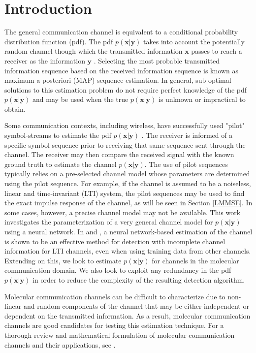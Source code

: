 \section{Introduction}

The general communication channel is equivalent to a conditional probability distribution function (pdf). The pdf $p(\mathbf{x}|\mathbf{y})$ takes into account the potentially random channel though which the transmitted information $\mathbf{x}$ passes to reach a receiver as the information $\mathbf{y}$ \cite[Ch.~7]{cover2012elements}. Selecting the most probable transmitted information sequence based on the received information sequence is known as maximum a posteriori (MAP) sequence estimation. In general, sub-optimal solutions to this estimation problem do not require perfect knowledge of the pdf $p(\mathbf{x}|\mathbf{y})$ and may be used when the true $p(\mathbf{x}|\mathbf{y})$ is unknown or impractical to obtain.

\par
Some communication contexts, including wireless, have successfully used "pilot" symbol-streams to estimate the pdf $p(\mathbf{x}|\mathbf{y})$ \cite{van1995channel}. The receiver is informed of a specific symbol sequence prior to receiving that same sequence sent through the channel. The receiver may then compare the received signal with the known ground truth to estimate the channel $p(\mathbf{x}|\mathbf{y})$.
The use of pilot sequences typically relies on a pre-selected channel model whose parameters are determined using the pilot sequence. For example, if the channel is assumed to be a noiseless, linear and time-invariant (LTI) system, the pilot sequences may be used to find the exact impulse response of the channel, as will be seen in Section \ref{LMMSE}. In some cases, however, a precise channel model may not be available. This work investigates the parameterization of a very general channel model for $p(\mathbf{x}|\mathbf{y})$ using a neural network. In \cite{shlezinger2019viterbinet} and \cite{shlezinger2020datadriven}, a neural network-based estimation of the channel is shown to be an effective method for detection with incomplete channel information for LTI channels, even when using training data from other channels.
 Extending on this, we look to estimate $p(\mathbf{x}|\mathbf{y})$ for channels in the molecular communication domain.
 We also look to exploit any redundancy in the pdf $p(\mathbf{x}|\mathbf{y})$ in order to reduce the complexity of the resulting detection algorithm.
\par
Molecular communication channels can be difficult to characterize due to non-linear and random components of the channel that may be either independent or dependent on the transmitted information. As a result, molecular communication channels are good candidates for testing this estimation technique. For a thorough review and mathematical formulation of molecular communication channels and their applications, see \cite{jamali2019channel}. 

